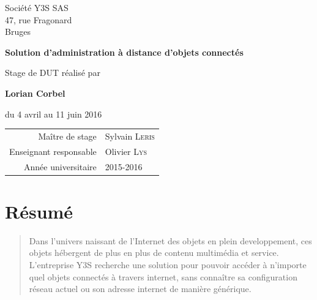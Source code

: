 \documentclass[a4paper,12pt]{book}
\theoremstyle{break}
\begin{document}
\begin{titlepage}
\begin{minipage}[b]{0.25\linewidth}
  \small
  Société Y3S SAS\\
  47, rue Fragonard\\
  Bruges
\end{minipage}

{%
  \bfseries\LARGE
  Solution d'administration à distance d'objets connectés
}

Stage de DUT réalisé par\par\medskip
{\Large \bfseries Lorian Corbel}\par\medskip
du 4 avril au 11 juin 2016

\renewcommand{\arraystretch}{1.5}
\begin{tabular}{r@{\quad}l}
  Maître de stage & Sylvain \textsc{Leris} \\
  Enseignant responsable & Olivier \textsc{Lys} \\
  Année universitaire & 2015-2016
\end{tabular}
\end{titlepage}


\frontmatter





\chapter{Résumé}
\begin{quotation}
	Dans l'univers naissant de l'Internet des objets en plein developpement, ces objets hébergent de plus en plus de contenu multimédia et service. L'entreprise Y3S recherche une solution pour pouvoir accéder à n'importe quel objets connectés à travers internet, sans connaître sa configuration réseau actuel ou son adresse internet de manière générique.
\end{quotation}
\end{document}
